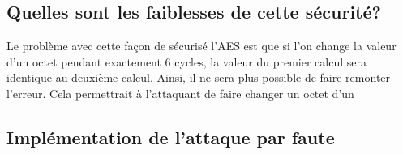 
\subsection{Quelles sont les faiblesses de cette sécurité?}

Le problème avec cette façon de sécurisé l'AES est que si l'on change la valeur
d'un octet pendant exactement 6 cycles, la valeur du premier calcul sera
identique au deuxième calcul.
Ainsi, il ne sera plus possible de faire remonter l'erreur. Cela permettrait à
l'attaquant de faire changer un octet d'un


\subsection{Implémentation de l'attaque par faute}

